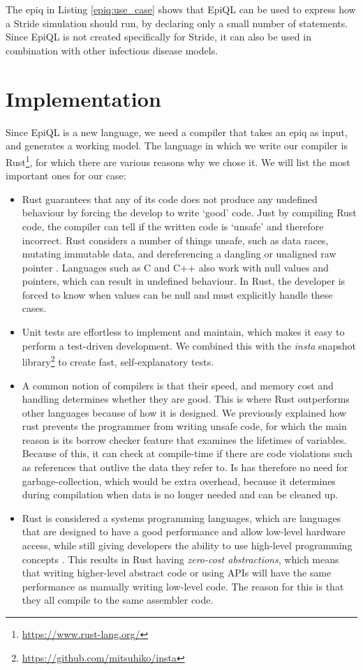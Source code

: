 \\\\
The epiq in Listing \ref{epiq:use_case} shows that EpiQL can be used to express how a Stride simulation should run, by declaring only a small number of statements. Since EpiQL is not created specifically for Stride, it can also be used in combination with other infectious disease models.

\section{Implementation}
\label{sec:implementation_epiql}
Since EpiQL is a new language, we need a compiler that takes an epiq as input, and generates a working model. The language in which we write our compiler is Rust\footnote{\url{https://www.rust-lang.org/}}, for which there are various reasons why we chose it. We will list the most important ones for our case:
\begin{itemize}
    \item Rust guarantees that any of its code does not produce any undefined behaviour by forcing the develop to write `good' code. Just by compiling Rust code, the compiler can tell if the written code is `unsafe' and therefore incorrect. Rust considers a number of things unsafe, such as data races, mutating immutable data, and dereferencing a dangling or unaligned raw pointer \cite{rust_undefined_behaviour}. Languages such as C and C++ also work with null values and pointers, which can result in undefined behaviour. In Rust, the developer is forced to know when values can be null and must explicitly handle these cases.
    \item Unit tests are effortless to implement and maintain, which makes it easy to perform a test-driven development. We combined this with the \textit{insta} snapshot library\footnote{\url{https://github.com/mitsuhiko/insta}} to create fast, self-explanatory tests.
    \item A common notion of compilers is that their speed, and memory cost and handling determines whether they are good. This is where Rust outperforms other languages because of how it is designed. We previously explained how rust prevents the programmer from writing unsafe code, for which the main reason is its borrow checker feature that examines the lifetimes of variables. Because of this, it can check at compile-time if there are code violations such as references that outlive the data they refer to. Is has therefore no need for garbage-collection, which would be extra overhead, because it determines during compilation when data is no longer needed and can be cleaned up.
    \item Rust is considered a systems programming languages, which are languages that are designed to have a good performance and allow low-level hardware access, while still giving developers the ability to use high-level programming concepts \cite{systems_programming_languages}. This results in Rust having \textit{zero-cost abstractions}, which means that writing higher-level abstract code or using APIs will have the same performance as manually writing low-level code. The reason for this is that they all compile to the same assembler code.
\end{itemize}

